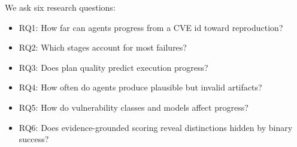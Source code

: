 We ask six research questions:
\begin{itemize}
\item RQ1: How far can agents progress from a CVE id toward reproduction?
\item RQ2: Which stages account for most failures?
\item RQ3: Does plan quality predict execution progress?
\item RQ4: How often do agents produce plausible but invalid artifacts?
\item RQ5: How do vulnerability classes and models affect progress?
\item RQ6: Does evidence-grounded scoring reveal distinctions hidden by binary success?
\end{itemize}
